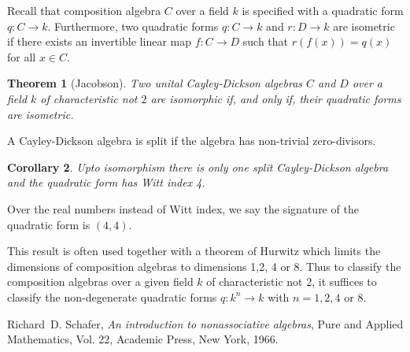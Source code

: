 \documentclass[12pt]{article}
\newtheorem{thm}{Theorem}
\newtheorem{coro}[thm]{Corollary}
\begin{document}
Recall that composition algebra $C$ over a field $k$ is specified with a quadratic form $q:C\to k$.
Furthermore, two quadratic forms $q:C\to k$ and $r:D\to k$ are isometric if there exists an
invertible linear map $f:C\to D$ such that $r(f(x))=q(x)$ for all $x\in C$.

\begin{thm}[Jacobson]\cite[Theorem 3.23]{Schafer:nonass}
Two unital Cayley-Dickson algebras $C$ and $D$ over a field $k$ of characteristic not $2$
are isomorphic if, and only if, their quadratic forms are isometric.
\end{thm}

A Cayley-Dickson algebra is split if the algebra has non-trivial zero-divisors.

\begin{coro}\cite[Corollary 3.24]{Schafer:nonass}
Upto isomorphism there is only one split Cayley-Dickson algebra and the quadratic form
has Witt index 4.
\end{coro}

Over the real numbers instead of Witt index, we say the signature of the quadratic form is $(4,4)$.

This result is often used together with a theorem of Hurwitz which limits the dimensions
of composition algebras to dimensions 1,2, 4 or 8.  Thus to classify the composition algebras
over a given field $k$ of characteristic not 2, it suffices to classify the non-degenerate
quadratic forms $q:k^n\to k$ with $n=1,2,4$ or $8$.

\begin{thebibliography}{7}
Richard~D. Schafer, \emph{An introduction to nonassociative algebras}, Pure and
  Applied Mathematics, Vol. 22, Academic Press, New York, 1966. 
\end{thebibliography}

\end{document}
